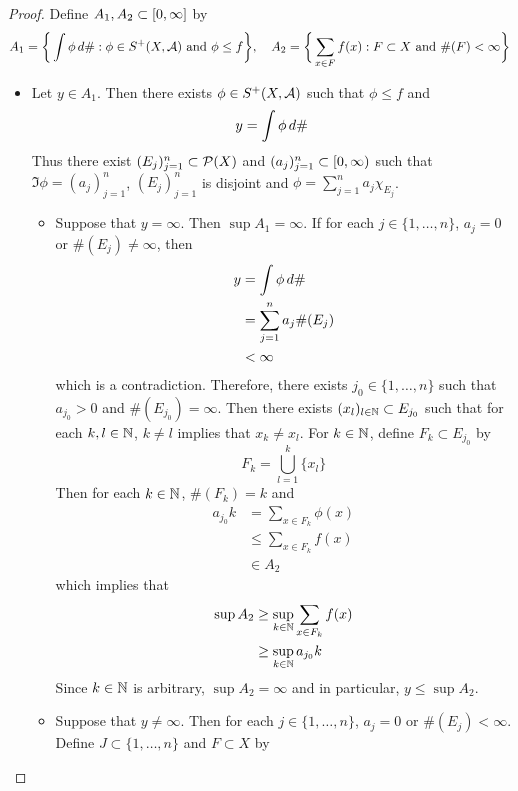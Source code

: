 \documentclass{book}
\begin{document}
	\begin{proof}
		Define $A_1, A_2 \subset [0,\infty]$ by 
		$$A_1 = \bigg \{\int \phi \, d \#: \phi \in S^+(X, \mathcal{A}) \text{ and } \phi \leq f \bigg \}, \quad A_2 = \bigg \{\sum\limits_{x \in F}f(x): F \subset X \text{ and } \#(F) < \infty \bigg \}$$ 
		\begin{itemize}
			\item Let $y \in A_1$. Then there exists $\phi \in S^+(X, \mathcal{A})$ such that $\phi \leq f$ and 
			$$y = \int \phi \, d \#$$  
			Thus there exist $(E_j)_{j=1}^n \subset \mathcal{P}(X)$ and $(a_j)_{j =1}^n \subset [0,\infty)$ such that $\Im \phi = (a_j)_{j =1}^n$, $(E_j)_{j=1}^n$ is disjoint and $\phi = \sum\limits_{j=1}^n a_j \chi_{E_j}$. \\
			\begin{itemize}
				\item Suppose that $y = \infty$. Then $\sup A_1 = \infty$. If for each $j \in \{1, \ldots, n\}$, $a_j = 0$ or $\#(E_j) \neq \infty$, then 
				\begin{align*}
					y
					& = \int \phi \, d \# \\
					& = \sum\limits_{j=1}^n a_j \#(E_j) \\
					& < \infty 
				\end{align*}
				which is a contradiction. Therefore, there exists $j_0 \in \{1, \ldots, n\}$ such that $a_{j_0} >0$ and $\#(E_{j_0}) = \infty$. Then there exists $(x_l)_{l \in \mathbb{N}} \subset E_{j_0}$ such that for each $k, l \in \mathbb{N}$, $k \neq l$ implies that $x_k \neq x_l$. For $k \in \mathbb{N}$, define $F_k \subset E_{j_0}$ by 
				$$F_k = \bigcup_{l=1}^k \{x_l\}$$
				Then for each $k \in \mathbb{N}$, $\#(F_k) = k$ and 
				\begin{align*}
					a_{j_0} k
					& = \sum\limits_{x \in F_k} \phi(x) \\
					& \leq \sum\limits_{x \in F_k}f(x) \\
					& \in A_2
				\end{align*}
				which implies that
				\begin{align*}
					\sup A_2
					& \geq \sup\limits_{k \in \mathbb{N}}  \sum\limits_{x \in F_k}f(x) \\
					& \geq \sup\limits_{k \in \mathbb{N}} a_{j_0} k
				\end{align*}
				Since $k \in \mathbb{N}$ is arbitrary, $\sup A_2 = \infty$ and in particular, $y \leq \sup A_2$.\\
				\item Suppose that $y \neq \infty$. Then for each $j \in \{1, \ldots, n\}$, $a_j = 0$ or $\#(E_j) < \infty$. Define $J \subset \{1, \ldots, n\}$ and $F \subset X$ by 

\end{itemize}
\end{itemize}
\end{proof}
\end{document}
